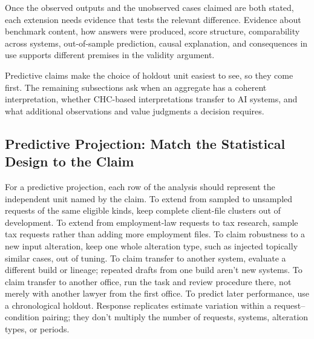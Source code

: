 \documentclass[12pt]{article}
\begin{document}
Once the observed outputs and the unobserved cases claimed are both stated, each extension needs evidence that tests the relevant difference. Evidence about benchmark content, how answers were produced, score structure, comparability across systems, out-of-sample prediction, causal explanation, and consequences in use supports different premises in the validity argument.

Predictive claims make the choice of holdout unit easiest to see, so they come first. The remaining subsections ask when an aggregate has a coherent interpretation, whether CHC-based interpretations transfer to AI systems, and what additional observations and value judgments a decision requires.

\subsection{Predictive Projection: Match the Statistical Design to the Claim}\label{ssec:matching}

For a predictive projection, each row of the analysis should represent the independent unit named by the claim. To extend from sampled to unsampled requests of the same eligible kinds, keep complete client-file clusters out of development. To extend from employment-law requests to tax research, sample tax requests rather than adding more employment files. To claim robustness to a new input alteration, keep one whole alteration type, such as injected topically similar cases, out of tuning. To claim transfer to another system, evaluate a different build or lineage; repeated drafts from one build aren't new systems. To claim transfer to another office, run the task and review procedure there, not merely with another lawyer from the first office. To predict later performance, use a chronological holdout. Response replicates estimate variation within a request--condition pairing; they don't multiply the number of requests, systems, alteration types, or periods.
\end{document}
